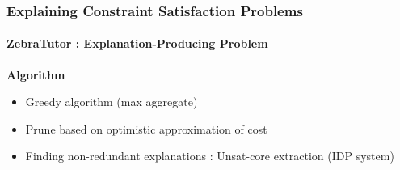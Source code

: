 \documentclass{beamer}
\begin{document}

\begin{frame}
    \frametitle{\small{Explaining Constraint Satisfaction Problems}}
    \framesubtitle{ZebraTutor : Explanation-Producing Problem}

    \textbf{Algorithm}
    \begin{itemize}
        \item Greedy algorithm (max aggregate)\pause
        \item Prune based on optimistic approximation of cost\pause
        \item Finding non-redundant explanations : Unsat-core extraction (IDP system)
    \end{itemize}

\end{frame}


\end{document}
